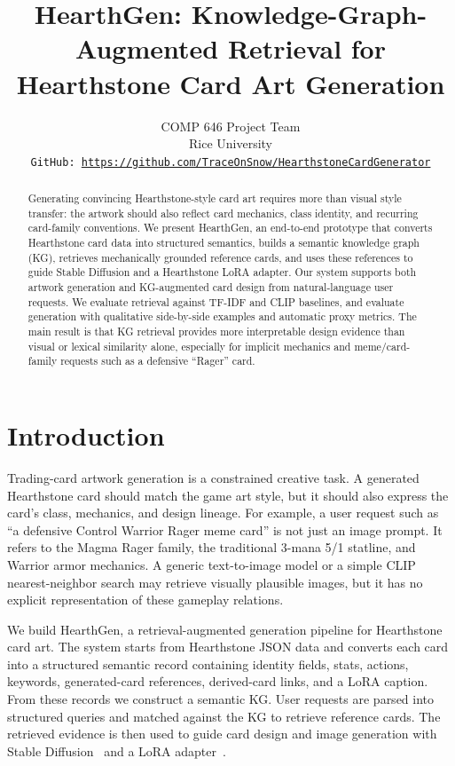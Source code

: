 \documentclass[10pt,twocolumn,letterpaper]{article}
\begin{document}
\title{HearthGen: Knowledge-Graph-Augmented Retrieval for Hearthstone Card Art Generation}

\author{COMP 646 Project Team\\
Rice University\\
{\tt\small GitHub: \url{https://github.com/TraceOnSnow/HearthstoneCardGenerator}}
}

\maketitle

\begin{abstract}
Generating convincing Hearthstone-style card art requires more than visual style transfer: the artwork should also reflect card mechanics, class identity, and recurring card-family conventions. We present HearthGen, an end-to-end prototype that converts Hearthstone card data into structured semantics, builds a semantic knowledge graph (KG), retrieves mechanically grounded reference cards, and uses these references to guide Stable Diffusion and a Hearthstone LoRA adapter. Our system supports both artwork generation and KG-augmented card design from natural-language user requests. We evaluate retrieval against TF-IDF and CLIP baselines, and evaluate generation with qualitative side-by-side examples and automatic proxy metrics. The main result is that KG retrieval provides more interpretable design evidence than visual or lexical similarity alone, especially for implicit mechanics and meme/card-family requests such as a defensive ``Rager'' card.
\end{abstract}

\section{Introduction}

Trading-card artwork generation is a constrained creative task. A generated Hearthstone card should match the game art style, but it should also express the card's class, mechanics, and design lineage. For example, a user request such as ``a defensive Control Warrior Rager meme card'' is not just an image prompt. It refers to the Magma Rager family, the traditional 3-mana 5/1 statline, and Warrior armor mechanics. A generic text-to-image model or a simple CLIP nearest-neighbor search may retrieve visually plausible images, but it has no explicit representation of these gameplay relations.

We build HearthGen, a retrieval-augmented generation pipeline for Hearthstone card art. The system starts from Hearthstone JSON data and converts each card into a structured semantic record containing identity fields, stats, actions, keywords, generated-card references, derived-card links, and a LoRA caption. From these records we construct a semantic KG. User requests are parsed into structured queries and matched against the KG to retrieve reference cards. The retrieved evidence is then used to guide card design and image generation with Stable Diffusion~\cite{rombach2022ldm} and a LoRA adapter~\cite{hu2021lora}.
\end{document}
